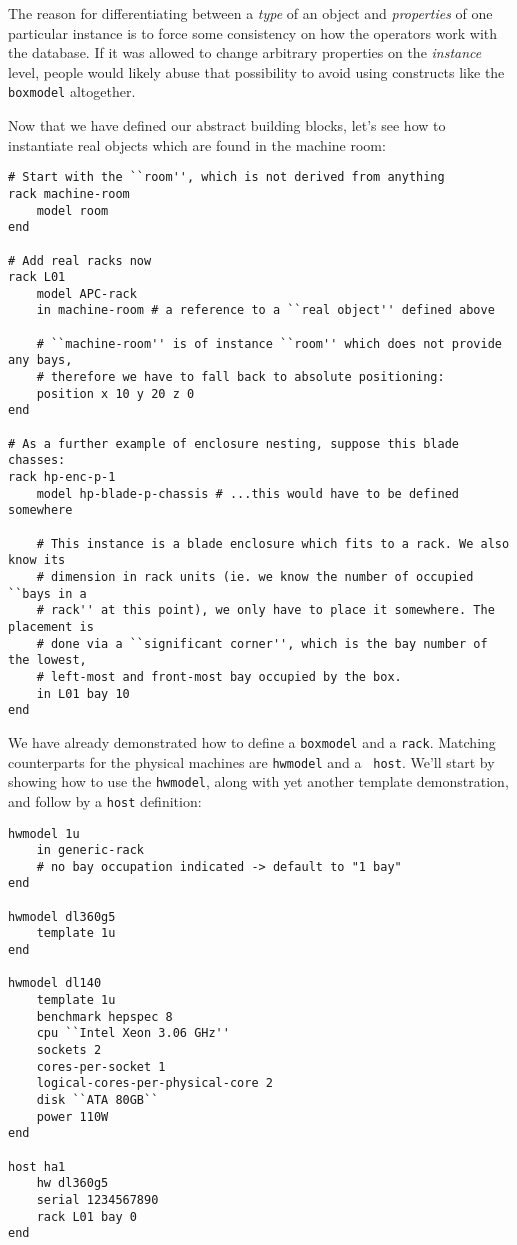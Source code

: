 \documentclass[11pt]{article}
\begin{document}
The reason for differentiating between a {\em type} of an object and {\em
properties} of one particular instance is to force some consistency on how the
operators work with the database.  If it was allowed to change arbitrary
properties on the {\em instance} level, people would likely abuse that
possibility to avoid using constructs like the {\tt boxmodel} altogether.

Now that we have defined our abstract building blocks, let's see how to
instantiate real objects which are found in the machine room:

{\scriptsize
\begin{verbatim}
# Start with the ``room'', which is not derived from anything
rack machine-room
    model room
end

# Add real racks now
rack L01
    model APC-rack
    in machine-room # a reference to a ``real object'' defined above

    # ``machine-room'' is of instance ``room'' which does not provide any bays,
    # therefore we have to fall back to absolute positioning:
    position x 10 y 20 z 0
end

# As a further example of enclosure nesting, suppose this blade chasses:
rack hp-enc-p-1
    model hp-blade-p-chassis # ...this would have to be defined somewhere

    # This instance is a blade enclosure which fits to a rack. We also know its
    # dimension in rack units (ie. we know the number of occupied ``bays in a
    # rack'' at this point), we only have to place it somewhere. The placement is
    # done via a ``significant corner'', which is the bay number of the lowest,
    # left-most and front-most bay occupied by the box.
    in L01 bay 10
end
\end{verbatim}
}

We have already demonstrated how to define a {\tt boxmodel} and a {\tt rack}.
Matching counterparts for the physical machines are {\tt hwmodel} and a {\tt
host}.  We'll start by showing how to use the {\tt hwmodel}, along with yet
another template demonstration, and follow by a {\tt host} definition:

{\scriptsize
\begin{verbatim}
hwmodel 1u
    in generic-rack
    # no bay occupation indicated -> default to "1 bay"
end

hwmodel dl360g5
    template 1u
end

hwmodel dl140
    template 1u
    benchmark hepspec 8
    cpu ``Intel Xeon 3.06 GHz''
    sockets 2
    cores-per-socket 1
    logical-cores-per-physical-core 2
    disk ``ATA 80GB``
    power 110W
end

host ha1
    hw dl360g5
    serial 1234567890
    rack L01 bay 0
end
\end{verbatim}
}
\end{document}
